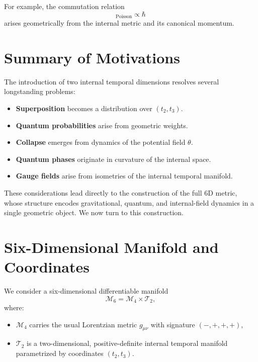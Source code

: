 \documentclass[12pt]{article}
\begin{document}
For example, the commutation relation
\begin{equation}
[t_2, t_3]_{\text{Poisson}} \propto \hbar
\end{equation}
arises geometrically from the internal metric and its canonical momentum.


\newpage
\section{Summary of Motivations}

The introduction of two internal temporal dimensions resolves several 
longstanding problems:
\begin{itemize}
\item \textbf{Superposition} becomes a distribution over \((t_2,t_3)\).
\item \textbf{Quantum probabilities} arise from geometric weights.
\item \textbf{Collapse} emerges from dynamics of the potential field \(\theta\).
\item \textbf{Quantum phases} originate in curvature of the internal space.
\item \textbf{Gauge fields} arise from isometries of the internal temporal 
manifold.
\end{itemize}

These considerations lead directly to the construction of the full 6D metric, 
whose structure encodes gravitational, quantum, and internal-field dynamics in 
a single geometric object. We now turn to this construction.


\newpage
\section{Six-Dimensional Manifold and Coordinates}

We consider a six-dimensional differentiable manifold
\[
\mathcal{M}_6 = \mathcal{M}_4 \times \mathcal{T}_2,
\]
where:
\begin{itemize}
\item \(\mathcal{M}_4\) carries the usual Lorentzian metric \(g_{\mu\nu}\) with
signature \((-,+,+,+)\),
\item \(\mathcal{T}_2\) is a two-dimensional, positive-definite internal temporal
manifold parametrized by coordinates \((t_2, t_3)\).
\end{itemize}
\end{document}
